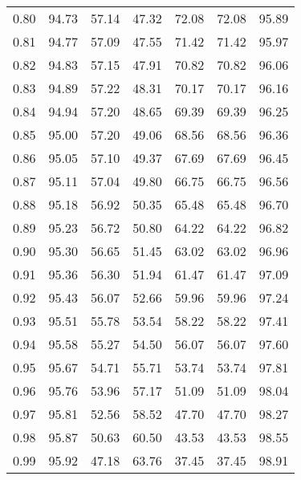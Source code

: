 \begin{tabular}{|c|c|c|c|c|c|c|}
      0.80 &     94.73 &     57.14 &      47.32 &   72.08 &      72.08 &         95.89 \\
      0.81 &     94.77 &     57.09 &      47.55 &   71.42 &      71.42 &         95.97 \\
      0.82 &     94.83 &     57.15 &      47.91 &   70.82 &      70.82 &         96.06 \\
      0.83 &     94.89 &     57.22 &      48.31 &   70.17 &      70.17 &         96.16 \\
      0.84 &     94.94 &     57.20 &      48.65 &   69.39 &      69.39 &         96.25 \\
      0.85 &     95.00 &     57.20 &      49.06 &   68.56 &      68.56 &         96.36 \\
      0.86 &     95.05 &     57.10 &      49.37 &   67.69 &      67.69 &         96.45 \\
      0.87 &     95.11 &     57.04 &      49.80 &   66.75 &      66.75 &         96.56 \\
      0.88 &     95.18 &     56.92 &      50.35 &   65.48 &      65.48 &         96.70 \\
      0.89 &     95.23 &     56.72 &      50.80 &   64.22 &      64.22 &         96.82 \\
      0.90 &     95.30 &     56.65 &      51.45 &   63.02 &      63.02 &         96.96 \\
      0.91 &     95.36 &     56.30 &      51.94 &   61.47 &      61.47 &         97.09 \\
      0.92 &     95.43 &     56.07 &      52.66 &   59.96 &      59.96 &         97.24 \\
      0.93 &     95.51 &     55.78 &      53.54 &   58.22 &      58.22 &         97.41 \\
      0.94 &     95.58 &     55.27 &      54.50 &   56.07 &      56.07 &         97.60 \\
      0.95 &     95.67 &     54.71 &      55.71 &   53.74 &      53.74 &         97.81 \\
      0.96 &     95.76 &     53.96 &      57.17 &   51.09 &      51.09 &         98.04 \\
      0.97 &     95.81 &     52.56 &      58.52 &   47.70 &      47.70 &         98.27 \\
      0.98 &     95.87 &     50.63 &      60.50 &   43.53 &      43.53 &         98.55 \\
      0.99 &     95.92 &     47.18 &      63.76 &   37.45 &      37.45 &         98.91 \\
\bottomrule
\end{tabular}
